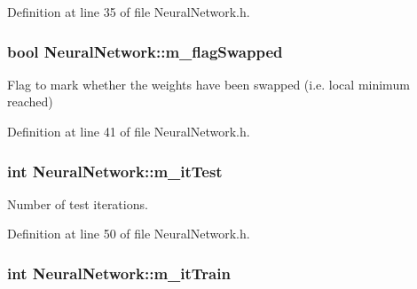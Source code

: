 Definition at line 35 of file Neural\+Network.\+h.

\subsubsection[{\texorpdfstring{m\+\_\+flag\+Swapped}{m_flagSwapped}}]{\setlength{\rightskip}{0pt plus 5cm}bool Neural\+Network\+::m\+\_\+flag\+Swapped\hspace{0.3cm}{\ttfamily [protected]}}\hypertarget{classNeuralNetwork_a5009762781007f09860915f307701a60}{}\label{classNeuralNetwork_a5009762781007f09860915f307701a60}


Flag to mark whether the weights have been swapped (i.\+e. local minimum reached) 



Definition at line 41 of file Neural\+Network.\+h.

\subsubsection[{\texorpdfstring{m\+\_\+it\+Test}{m_itTest}}]{\setlength{\rightskip}{0pt plus 5cm}int Neural\+Network\+::m\+\_\+it\+Test\hspace{0.3cm}{\ttfamily [protected]}}\hypertarget{classNeuralNetwork_ae4f1fb12e7f5df8dac69abda6fe4d141}{}\label{classNeuralNetwork_ae4f1fb12e7f5df8dac69abda6fe4d141}


Number of test iterations. 



Definition at line 50 of file Neural\+Network.\+h.

\subsubsection[{\texorpdfstring{m\+\_\+it\+Train}{m_itTrain}}]{\setlength{\rightskip}{0pt plus 5cm}int Neural\+Network\+::m\+\_\+it\+Train\hspace{0.3cm}{\ttfamily [protected]}}\hypertarget{classNeuralNetwork_a25ea37c7b768bf2ade89c55b9e159ee2}{}\label{classNeuralNetwork_a25ea37c7b768bf2ade89c55b9e159ee2}


